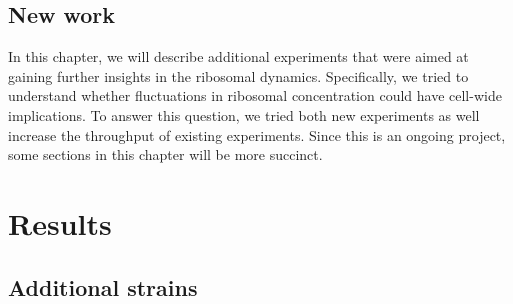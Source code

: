 \subsection{New work}

In this chapter, we will describe additional experiments that were aimed at gaining further insights in the ribosomal dynamics.
Specifically, we tried to understand whether fluctuations in ribosomal concentration could have cell-wide implications.
%
To answer this question, we tried both new experiments as well increase the throughput of existing experiments.
%
Since this is an ongoing project, some sections in this chapter will be more succinct.

\section{Results}

\subsection{Additional strains}

